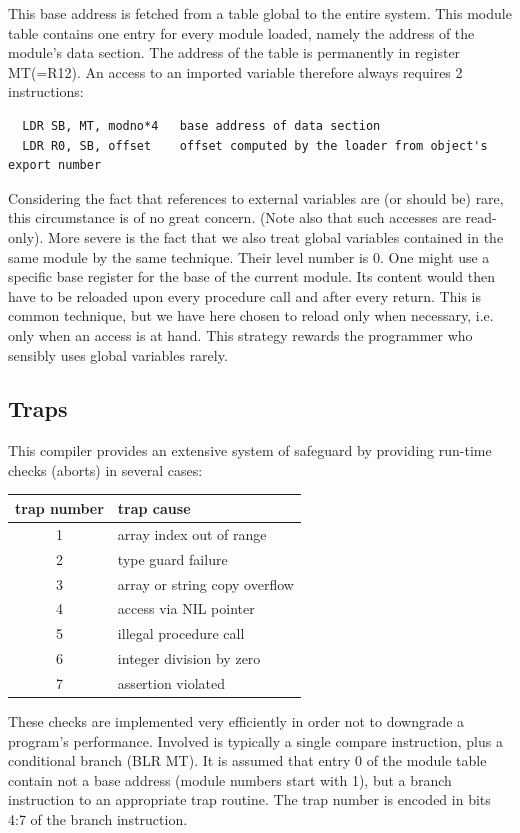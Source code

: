 This base address is fetched from a table global to the entire system. This module table contains
one entry for every module loaded, namely the address of the module's data section. The address
of the table is permanently in register MT(=R12). An access to an imported variable therefore
always requires 2 instructions:
\begin{verbatim}
  LDR SB, MT, modno*4   base address of data section
  LDR R0, SB, offset    offset computed by the loader from object's export number
\end{verbatim}

Considering the fact that references to external variables are (or should be) rare, this circumstance
is of no great concern. (Note also that such accesses are read-only). More severe is the fact that
we also treat global variables contained in the same module by the same technique. Their level
number is 0. One might use a specific base register for the base of the current module. Its content
would then have to be reloaded upon every procedure call and after every return. This is common
technique, but we have here chosen to reload only when necessary, i.e. only when an access is at
hand. This strategy rewards the programmer who sensibly uses global variables rarely.

\subsection{Traps}
This compiler provides an extensive system of safeguard by providing run-time checks (aborts) in
several cases:
\begin{table}[h!]
  \centering
  \begin{tabular}{c l}
    trap number & trap cause \\\hline
    1 & array index out of range \\
    2 & type guard failure \\
    3 & array or string copy overflow \\
    4 & access via NIL pointer \\
    5 & illegal procedure call \\
    6 & integer division by zero \\
    7 & assertion violated
  \end{tabular}
\end{table}

These checks are implemented very efficiently in order not to downgrade a program's performance.
Involved is typically a single compare instruction, plus a conditional branch (BLR MT). It is assumed
that entry 0 of the module table contain not a base address (module numbers start with 1), but a
branch instruction to an appropriate trap routine. The trap number is encoded in bits 4:7 of the
branch instruction.

